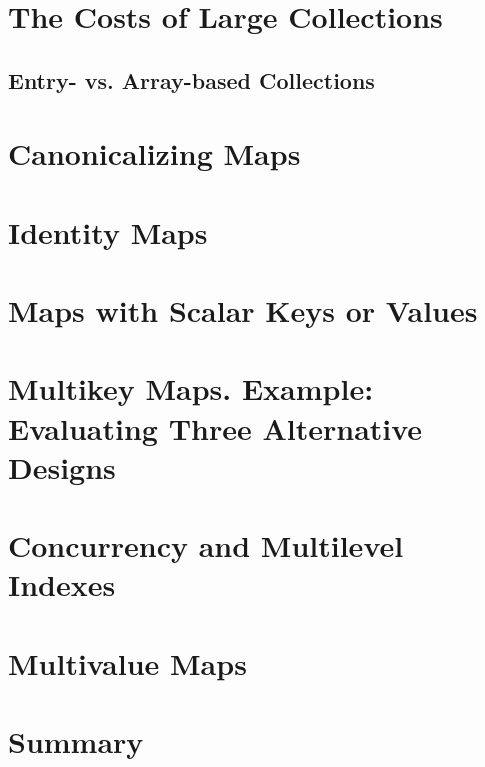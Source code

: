 \section{The Costs of Large Collections}

\subsection{Entry- vs. Array-based Collections}

\section{Canonicalizing Maps}

\section{Identity Maps}

\section{Maps with Scalar Keys or Values}

\section{Multikey Maps. Example: Evaluating Three Alternative Designs}

\section{Concurrency and Multilevel Indexes}

\section{Multivalue Maps}

\section{Summary}

